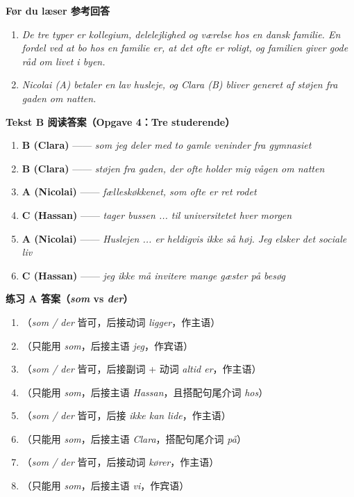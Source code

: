 \begin{answerbox}
\textbf{Før du læser 参考回答}
\begin{enumerate}
  \item \textit{De tre typer er kollegium, delelejlighed og værelse hos en dansk familie. En fordel ved at bo hos en familie er, at det ofte er roligt, og familien giver gode råd om livet i byen.}
  \item \textit{Nicolai (A) betaler en lav husleje, og Clara (B) bliver generet af støjen fra gaden om natten.}
\end{enumerate}

\textbf{Tekst B 阅读答案（Opgave 4：Tre studerende）}
\begin{enumerate}
  \item \textbf{B (Clara)} —— \textit{som jeg deler med to gamle veninder fra gymnasiet}
  \item \textbf{B (Clara)} —— \textit{støjen fra gaden, der ofte holder mig vågen om natten}
  \item \textbf{A (Nicolai)} —— \textit{fælleskøkkenet, som ofte er ret rodet}
  \item \textbf{C (Hassan)} —— \textit{tager bussen ... til universitetet hver morgen}
  \item \textbf{A (Nicolai)} —— \textit{Huslejen ... er heldigvis ikke så høj. Jeg elsker det sociale liv}
  \item \textbf{C (Hassan)} —— \textit{jeg ikke må invitere mange gæster på besøg}
\end{enumerate}

\textbf{练习 A 答案（\textit{som} vs \textit{der}）}
\begin{enumerate}
  \item {}（\textit{som / der} 皆可，后接动词 \textit{ligger}，作主语）
  \item {}（只能用 \textit{som}，后接主语 \textit{jeg}，作宾语）
  \item {}（\textit{som / der} 皆可，后接副词 + 动词 \textit{altid er}，作主语）
  \item {}（只能用 \textit{som}，后接主语 \textit{Hassan}，且搭配句尾介词 \textit{hos}）
  \item {}（\textit{som / der} 皆可，后接 \textit{ikke kan lide}，作主语）
  \item {}（只能用 \textit{som}，后接主语 \textit{Clara}，搭配句尾介词 \textit{på}）
  \item {}（\textit{som / der} 皆可，后接动词 \textit{kører}，作主语）
  \item {}（只能用 \textit{som}，后接主语 \textit{vi}，作宾语）
\end{enumerate}


\end{answerbox}
